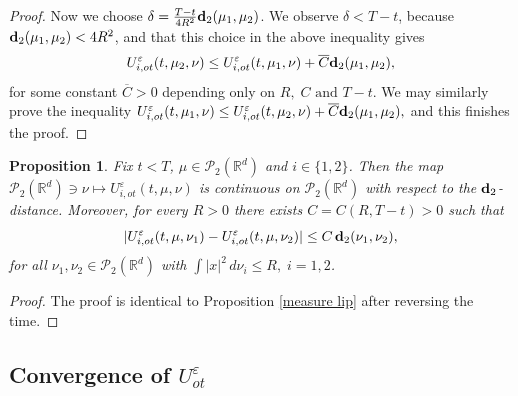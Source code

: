 \documentclass[reqno,11pt]{amsart}
\newtheorem{proposition}[theorem]{Proposition}
\numberwithin{equation}{section}
\newcommand{\zd}[1]{{\color{brown}[ZD:#1]}}
\newcommand{\R}{\mathbb{R}} %
\newcommand{\e}{\varepsilon}
\begin{document}
\begin{proof}
     Now we choose $\delta=\frac{T-t}{4R^2}{\bf d}_2(\mu_1,\mu_2)$. We observe $\delta< T-t$, because ${\bf d}_2(\mu_1,\mu_2)<4R^2$, and that this choice in the above inequality gives
    $$U_{i,ot}^\e(t,\mu_2,\nu)\le U_{i,ot}^\e(t,\mu_1,\nu)+\overline{C}{\bf d}_2(\mu_1,\mu_2),$$
    for some constant $\overline{C}>0$ depending only on $R,\; C\text{ and }T-t$. We may similarly prove the inequality $U_{i,ot}^\e(t,\mu_1,\nu)\le U_{i,ot}^\e(t,\mu_2,\nu)+\overline{C}{\bf d}_2(\mu_1,\mu_2),$ and this finishes the proof.
\end{proof}

\begin{proposition}\label{measure lip2}
    Fix $t<T$, $\mu\in\mathcal P_2(\mathbb R^d)$ and $i\in \{1,2\}$.
    Then the map $\mathcal{P}_2(\R^d)\ni\nu\mapsto U_{i,ot}^\varepsilon(t,\mu,\nu)$ is continuous on
    $\mathcal P_2(\mathbb R^d)$ with respect to the ${\bf d}_2$-distance. Moreover, for every $R>0$ there exists $C=C(R,T-t)>0$ such that
    \[
    |U_{i,ot}^\varepsilon(t,\mu,\nu_1)-U_{i,ot}^\varepsilon(t,\mu,\nu_2)|
    \le C\,{\bf d}_2(\nu_1,\nu_2),
    \]
    for all $\nu_1,\nu_2\in\mathcal P_2(\mathbb R^d)$
    with $\int|x|^2\,d\nu_i\le R,\; i=1,2$.
\end{proposition}

\begin{proof}
    The proof is identical to Proposition \ref{measure lip} after reversing the time.
\end{proof}

\subsection{Convergence of $U_{ot}^\e$}
\end{document}
